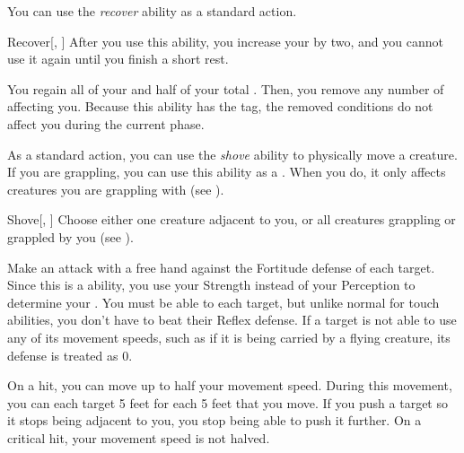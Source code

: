         \label{Recover} You can use the \textit{recover} ability as a standard action.
        \begin{activeability}{Recover}[, ]
            \rankline
            After you use this ability, you increase your  by two, and you cannot use it again until you finish a short rest.

            You regain all of your  and half of your total .
            Then, you remove any number of  affecting you.
            Because this ability has the  tag, the removed conditions do not affect you during the current phase.
        \end{activeability}

        \label{Shove} As a standard action, you can use the \textit{shove} ability to physically move a creature.
        If you are grappling, you can use this ability as a .
        When you do, it only affects creatures you are grappling with (see ).

        \begin{activeability}{Shove}[, ]
            \rankline
            Choose either one creature adjacent to you, or all creatures grappling or grappled by you (see ).

            Make an attack with a free hand against the Fortitude defense of each target.
            Since this is a  ability, you use your Strength instead of your Perception to determine your .
            You must be able to  each target, but unlike normal for touch abilities, you don't have to beat their Reflex defense.
            If a target is not able to use any of its movement speeds, such as if it is being carried by a flying creature, its defense is treated as 0.

            On a hit, you can move up to half your movement speed.
            During this movement, you can  each target 5 feet for each 5 feet that you move.
            If you push a target so it stops being adjacent to you, you stop being able to push it further.
            On a critical hit, your movement speed is not halved.
        \end{activeability}

